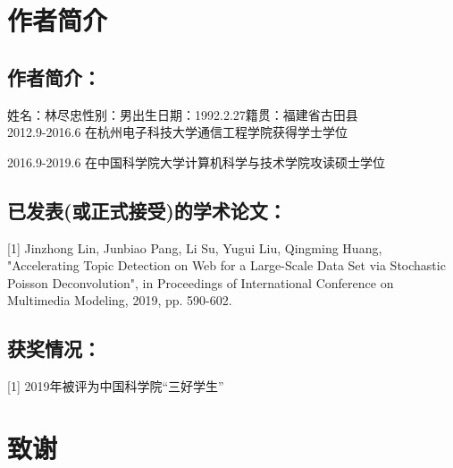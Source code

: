 \chapter{作者简介}


\section*{作者简介：}
	姓名：林尽忠\quad 性别：男\quad 出生日期：1992.2.27\quad 籍贯：福建省古田县\\

	2012.9-2016.6	在杭州电子科技大学通信工程学院获得学士学位

	2016.9-2019.6 	在中国科学院大学计算机科学与技术学院攻读硕士学位

\section*{已发表(或正式接受)的学术论文：}

[1] Jinzhong Lin, Junbiao Pang, Li Su, Yugui Liu, Qingming Huang, "Accelerating Topic Detection on Web for a Large-Scale Data Set via Stochastic Poisson Deconvolution", in Proceedings of International Conference on Multimedia Modeling, 2019, pp. 590-602.

 \section*{获奖情况：}
 
 [1] 2019年被评为中国科学院“三好学生”



\chapter[致谢]{致\quad 谢}%
\thispagestyle{noheaderstyle}%

